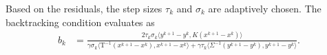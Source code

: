 \documentclass[A4,12pt]{article}
\providecommand{\iprod}[2]{\langle#1,#2\rangle}
\newcommand{\Tau}{\mathrm{T}}
\begin{document}
Based on the residuals, the step sizes $\tau_k$ and $\sigma_k$ are adaptively chosen. The backtracking condition evaluates as
\begin{equation}
  \begin{aligned}
    b_k &= \frac{2 \tau_k \sigma_k \iprod{y^{k+1} - y^k}{K (x^{k+1} - x^k)}}{\gamma \sigma_k \iprod{\Tau^{-1}(x^{k+1} - x^k)}{x^{k+1} - x^k} + \gamma \tau_k \iprod{\Sigma^{-1}(y^{k+1} - y^k)}{y^{k+1} - y^k}}.
\end{aligned}
\end{equation}
\end{document}

